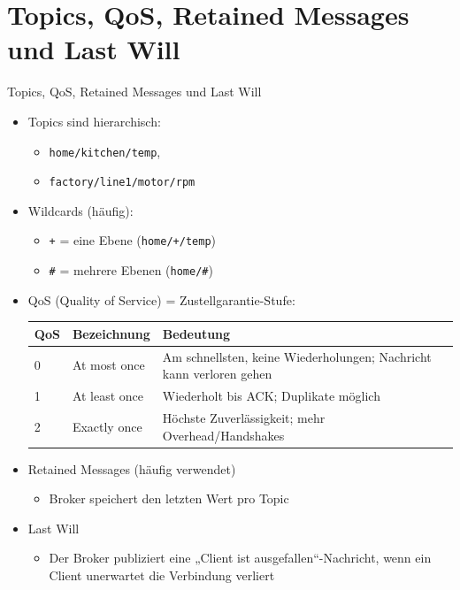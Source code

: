 ﻿\section{Topics, QoS, Retained Messages und Last Will}

\begin{frame}{Topics, QoS, Retained Messages und Last Will}
  \begin{itemize}
\item \alert{Topics sind hierarchisch}:
	\begin{itemize}
\item \texttt{home/kitchen/temp},
\item \texttt{factory/line1/motor/rpm}
	\end{itemize}
\item \alert{Wildcards} (häufig):
	\begin{itemize}
\item \texttt{+} = eine Ebene (\texttt{home/+/temp})
\item \texttt{\#} = mehrere Ebenen (\texttt{home/\#})
	\end{itemize}
\item \alert{QoS (Quality of Service)} = Zustellgarantie-Stufe:

  \vspace{0.5ex}
  \begin{tabular}{lll}
    \toprule
    \alert{QoS} & \alert{Bezeichnung} & \alert{Bedeutung} \\
    \midrule
    0 & At most once  & Am schnellsten, keine Wiederholungen; Nachricht kann verloren gehen \\
    1 & At least once & Wiederholt bis ACK; Duplikate möglich \\
    2 & Exactly once  & Höchste Zuverlässigkeit; mehr Overhead/Handshakes \\
    \bottomrule
  \end{tabular}

  \vspace{0.5ex}
\item \alert{Retained Messages} (häufig verwendet)
  \begin{itemize}
\item Broker speichert den letzten Wert pro Topic
  \end{itemize}

  \vspace{0.5ex}
\item \alert{Last Will}
  \begin{itemize}
\item Der Broker publiziert eine „Client ist ausgefallen“-Nachricht, wenn ein Client unerwartet die Verbindung verliert
  \end{itemize}
  \end{itemize}
\end{frame}
